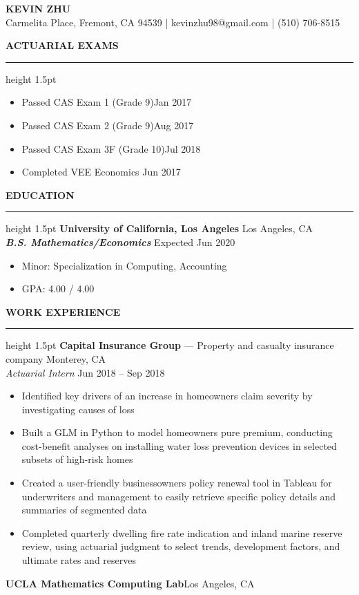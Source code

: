 \documentclass[11pt,letterpaper]{article}
\newcommand{\sectline}{\vspace{4pt}\hrule height 1.5pt\vspace{4pt}}
\newcommand{\sectspace}{\vspace{8pt}}
\newcommand{\smallspace}{\vspace{4pt}}
\begin{document}
\centering
{\fontsize{13pt}{13pt}\selectfont \textbf{KEVIN ZHU}} \vspace{2pt} \\
{\fontsize{12pt}{13pt} Carmelita Place, Fremont, CA 94539 | kevinzhu98@gmail.com | (510) 706-8515}
\sectspace

\fontsize{11pt}{13pt}\selectfont
\raggedright
\textbf{ACTUARIAL EXAMS}\sectline
\begin{itemize}
	\item Passed CAS Exam 1 (Grade 9)\hfill Jan 2017
	\item Passed CAS Exam 2 (Grade 9)\hfill Aug 2017
	\item Passed CAS Exam 3F (Grade 10)\hfill Jul 2018
	\item Completed VEE Economics \hfill Jun 2017
\end{itemize}
\sectspace


\textbf{EDUCATION}\sectline
\textbf{University of California, Los Angeles} \hfill Los Angeles, CA \\
\textbf{\textit{B.S. Mathematics/Economics}} \hfill Expected Jun 2020 
\begin{itemize}
	\item Minor: Specialization in Computing, Accounting
	\item GPA: 4.00 / 4.00
\end{itemize}
\sectspace

\textbf{WORK EXPERIENCE}\sectline
\textbf{Capital Insurance Group} --- Property and casualty insurance company \hfill Monterey, CA \\
\textit{Actuarial Intern} \hfill Jun 2018 -- Sep 2018 
\begin{itemize}
	\item Identified key drivers of an increase in homeowners claim severity by investigating causes of loss
	\item Built a GLM in Python to model homeowners pure premium, conducting cost-benefit analyses on installing water loss prevention devices in selected subsets of high-risk homes 
	\item Created a user-friendly businessowners policy renewal tool in Tableau for underwriters and management to easily retrieve specific policy details and summaries of segmented data
	\item Completed quarterly dwelling fire rate indication and inland marine reserve review, using actuarial judgment to select trends, development factors, and ultimate rates and reserves
\end{itemize}
\smallspace 
\textbf{UCLA Mathematics Computing Lab}\hfill Los Angeles, CA \\
\end{document}
